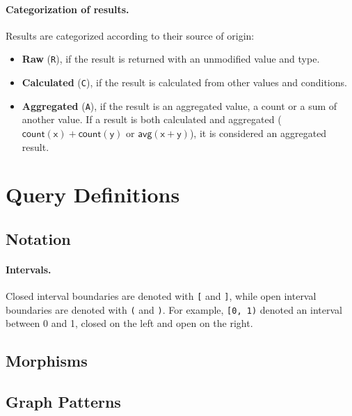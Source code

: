 \paragraph{Categorization of results.} Results are categorized according to their source of origin:

\begin{itemize}
	\item \textbf{Raw} (\texttt{R}), if the result is returned with an unmodified value and type.
	\item \textbf{Calculated} (\texttt{C}), if the result is calculated from other values and conditions.
	\item \textbf{Aggregated} (\texttt{A}), if the result is an aggregated value, \eg a count or a sum of another value. If a result is both calculated and aggregated (\eg $\mathsf{count(x) + count(y)}$ or $\mathsf{avg(x + y)}$), it is considered an aggregated result.
\end{itemize}



\section{Query Definitions}

\subsection{Notation}

\paragraph{Intervals.} Closed interval boundaries are denoted with \texttt{[} and \texttt{]}, while open interval boundaries are denoted with \texttt{(} and \texttt{)}. For example, \texttt{[0, 1)} denoted an interval between 0 and 1, closed on the left and open on the right.

\subsection{Morphisms}


\subsection{Graph Patterns}

